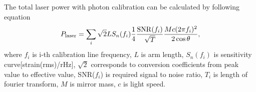 The total laser power with photon calibration can be calculated by following equation
\begin{equation}
P_{\rm laser} = \sum_i \sqrt{2} L S_n(f_i) \frac{1}{4} \frac{{\rm SNR}(f_i)}{\sqrt{T}} \frac{Mc(2 \pi f_i)^2}{2 \cos \theta}, 
\end{equation}
where $f_i$ is i-th calibration line frequency, 
$L$ is arm length, $S_n(f_i)$ is sensitivity curve[strain(rms)/rHz], 
$\sqrt{2}$ corresponds to conversion coefficients from peak value to effective value, 
SNR($f_i$) is required signal to noise ratio, 
$T_i$ is length of fourier transform, 
$M$ is mirror mass,
$c$ is light speed.


